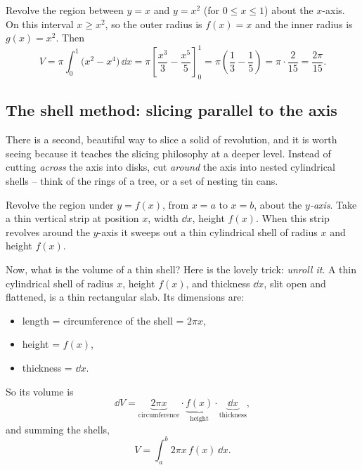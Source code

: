 \begin{example}
\label{ch26:ex-washer}
Revolve the region between $y=x$ and $y=x^2$ (for $0\le x\le 1$) about the
$x$-axis. On this interval $x \ge x^2$, so the outer radius is $f(x)=x$ and the
inner radius is $g(x)=x^2$. Then
\[
  V = \pi\int_0^1\bigl(x^2 - x^4\bigr)\,\dd x
    = \pi\left[\frac{x^3}{3} - \frac{x^5}{5}\right]_0^1
    = \pi\left(\frac13 - \frac15\right)
    = \pi\cdot\frac{2}{15} = \frac{2\pi}{15}.
\]
\end{example}

\subsection{The shell method: slicing parallel to the axis}

There is a second, beautiful way to slice a solid of revolution, and it is worth
seeing because it teaches the slicing philosophy at a deeper level. Instead of
cutting \emph{across} the axis into disks, cut \emph{around} the axis into nested
cylindrical shells -- think of the rings of a tree, or a set of nesting tin cans.

Revolve the region under $y=f(x)$, from $x=a$ to $x=b$, about the \emph{$y$-axis}.
Take a thin vertical strip at position $x$, width $\dd x$, height $f(x)$. When this
strip revolves around the $y$-axis it sweeps out a thin cylindrical shell of radius
$x$ and height $f(x)$.

Now, what is the volume of a thin shell? Here is the lovely trick: \emph{unroll
it}. A thin cylindrical shell of radius $x$, height $f(x)$, and thickness $\dd x$,
slit open and flattened, is a thin rectangular slab. Its dimensions are:
\begin{itemize}
  \item length = circumference of the shell = $2\pi x$,
  \item height = $f(x)$,
  \item thickness = $\dd x$.
\end{itemize}
So its volume is
\[
  \dd V = \underbrace{2\pi x}_{\text{circumference}}\cdot
          \underbrace{f(x)}_{\text{height}}\cdot
          \underbrace{\dd x}_{\text{thickness}},
\]
and summing the shells,
\[
  \boxed{\,V = \int_a^b 2\pi x\,f(x)\,\dd x.\,}
\]

